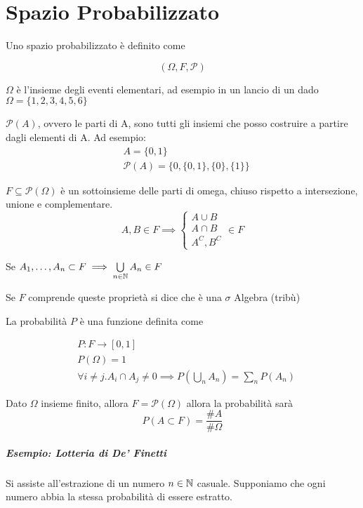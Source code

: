 \chapter{Spazio Probabilizzato}

Uno spazio probabilizzato è definito come

\[ (\Omega, F, \mathcal{P}) \]

$ \Omega $ è l'insieme degli eventi elementari, ad esempio in un lancio di un dado $ \Omega = \{1,2,3,4,5,6\} $

$ \mathcal{P}(A)$, ovvero le parti di A, sono tutti gli insiemi che posso costruire a partire dagli elementi di A. Ad esempio:
\begin{align*}
& A = \{0, 1\} \\
& \mathcal{P}(A) = \{0, \{0, 1\}, \{0\}, \{1\}\}
\end{align*}

$ F \subseteq \mathcal{P}(\Omega) $ è un sottoinsieme delle parti di omega, chiuso rispetto a intersezione, unione e complementare.
\[ A,B \in F \implies \begin{cases}
A \cup B \\
A \cap B \\
A^C, B^C
\end{cases} \in F\]

Se $ A_1, \dots, A_n \subset F \implies \bigcup\limits_{n \in \mathbb{N}} A_n \in F $

Se $ F $ comprende queste proprietà si dice che è una $ \sigma $ Algebra (tribù)

La probabilità $ P $ è una funzione definita come

\begin{align*}
&P : F \to [0,1] \\
& P(\Omega) = 1 \\
& \forall i \neq j . A_i \cap A_j \neq 0 \implies P \left( \bigcup\limits_{n} A_n \right) = \sum_{n} P(A_n)
\end{align*}

Dato $ \Omega $ insieme finito, allora $ F = \mathcal{P}(\Omega) $ allora la probabilità sarà
\[  P (A \subset F) = \dfrac{\#A}{\#\Omega} \]

\paragraph{Esempio: Lotteria di De' Finetti}
Si assiste all'estrazione di un numero $ n \in \mathbb{N} $ casuale. Supponiamo che ogni numero abbia la stessa probabilità di essere estratto.

